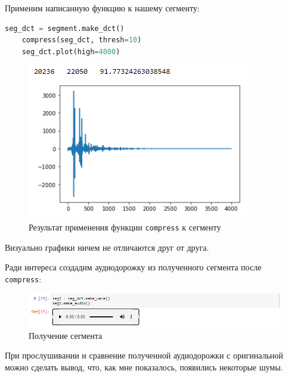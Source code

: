 \documentclass[a4paper]{article}
\begin{document}
            Применим написанную функцию к нашему сегменту:
            
\begin{lstlisting}[language=Python, caption= Применение функции \texttt{compress} к сегменту]
    seg_dct = segment.make_dct()
    compress(seg_dct, thresh=10)
    seg_dct.plot(high=4000)
\end{lstlisting}               
            
            \begin{figure}[H]
                \centering
                \includegraphics{ex_2_segment_dct_compress.png} 
                \caption{Результат применения функции \texttt{compress} к сегменту}
                \label{fig:ex_2_segment_dct_compress}
            \end{figure}
            
            Визуально графики ничем не отличаются друг от друга. 
            
            Ради интереса создадим аудиодорожку из полученного сегмента после \\ \texttt{compress}:
            
            \begin{figure}[H]
                \centering
                \includegraphics[width=\textwidth]{ex_2_segment_dct_compress_audio.png}
                \caption{Получение сегмента}
                \label{fig:ex_2_segment_dct_compress_audio}
            \end{figure}
            
            При прослушивании и сравнение полученной аудиодорожки с оригинальной можно сделать вывод, что, как мне показалось, появились некоторые шумы.
            
\end{document}
